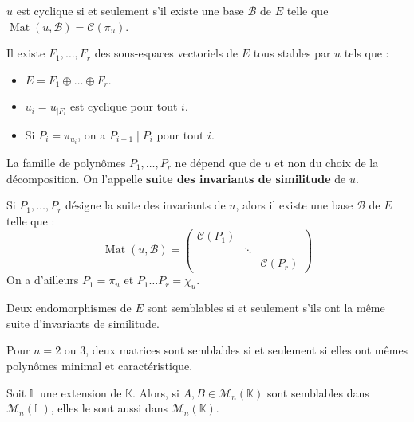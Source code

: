   \begin{proposition}
    $u$ est cyclique si et seulement s'il existe une base $\mathcal{B}$ de $E$ telle que $\operatorname{Mat}(u, \mathcal{B}) = \mathcal{C}(\pi_u)$.
  \end{proposition}
  
  \begin{theorem}
    Il existe $F_1, \dots, F_r$ des sous-espaces vectoriels de $E$ tous stables par $u$ tels que :
    \begin{itemize}
      \item $E = F_1 \oplus \dots \oplus F_r$.
      \item $u_i = u_{|F_i}$ est cyclique pour tout $i$.
      \item Si $P_i = \pi_{u_i}$, on a $P_{i+1} \mid P_i$ pour tout $i$.
    \end{itemize}
    La famille de polynômes $P_1, \dots, P_r$ ne dépend que de $u$ et non du choix de la décomposition. On l'appelle \textbf{suite des invariants de similitude} de $u$.
  \end{theorem}
  
  \begin{theorem}
    Si $P_1, \dots, P_r$ désigne la suite des invariants de $u$, alors il existe une base $\mathcal{B}$ de $E$ telle que :
    \[ \operatorname{Mat}(u, \mathcal{B}) = \begin{pmatrix} \mathcal{C}(P_1) & & \\ & \ddots & \\ & & \mathcal{C}(P_r) \end{pmatrix} \]
    On a d'ailleurs $P_1 = \pi_u$ et $P_1 \dots P_r = \chi_u$.
  \end{theorem}
  
  \begin{corollary}
    Deux endomorphismes de $E$ sont semblables si et seulement s'ils ont la même suite d'invariants de similitude.
  \end{corollary}
  
  \begin{application}
    Pour $n = 2$ ou $3$, deux matrices sont semblables si et seulement si elles ont mêmes polynômes minimal et caractéristique.
  \end{application}
  
  \begin{application}
    Soit $\mathbb{L}$ une extension de $\mathbb{K}$. Alors, si $A, B \in \mathcal{M}_n(\mathbb{K})$ sont semblables dans $\mathcal{M}_n(\mathbb{L})$, elles le sont aussi dans $\mathcal{M}_n(\mathbb{K})$.
  \end{application}
  
